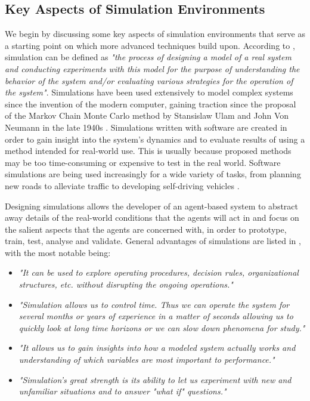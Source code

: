 \subsection{Key Aspects of Simulation Environments}
We begin by discussing some key aspects of simulation environments that serve as a starting point on which more advanced techniques build upon. According to %
\cite{Shannon1998INTRODUCTIONSIMULATION}, simulation can be defined as \textit{"the process of designing a model of a real system and conducting experiments with this model for the purpose of understanding the behavior of the system and/or evaluating various strategies for the operation of the system"}. Simulations have been used extensively to model complex systems since the invention of the modern computer, gaining traction since the proposal of the Markov Chain Monte Carlo method by Stansislaw Ulam and John Von Neumann in the late 1940s \cite{Robert2011AIncomplete}. Simulations written with software are created in order to gain insight into the system's dynamics and to evaluate results of using a method intended for real-world use. This is usually because proposed methods may be too time-consuming or expensive to test in the real world. Software simulations are being used increasingly for a wide variety of tasks, from planning new roads to alleviate traffic \cite{Pell2017TrendsSimulation} to developing self-driving vehicles \cite{Dosovitskiy2017CARLA:Simulator}. 

Designing simulations allows the developer of an agent-based system to abstract away details of the real-world conditions that the agents will act in and focus on the salient aspects that the agents are concerned with, in order to prototype, train, test, analyse and validate. General advantages of simulations are listed in  \cite{Shannon1998INTRODUCTIONSIMULATION}, with the most notable being:
\begin{itemize}
    \item \textit{"It can be used to explore operating procedures, decision rules, organizational structures, etc. without disrupting the ongoing operations."}
    \item \textit{"Simulation allows us to control time. Thus we can operate the system for several months or years of experience in a matter of seconds allowing us to quickly look at long time horizons or we can slow down phenomena for study."}
    \item \textit{"It allows us to gain insights into how a modeled system actually works and understanding of which variables are most important to performance."}
    \item \textit{"Simulation's great strength is its ability to let us experiment with new and unfamiliar situations and to answer "what if" questions."}
\end{itemize}


